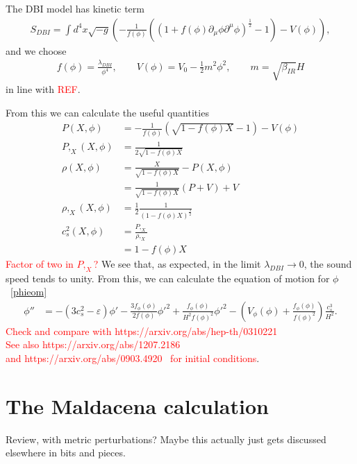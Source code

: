     The DBI model has kinetic term
\begin{align}\label{eq:dbi_action}
    S_{DBI}=\int d^4x\sqrt{-g}\left(-\frac{1}{f(\phi)}\left(\left(1+f(\phi)\partial_\mu\phi\partial^\mu\phi\right)^{\frac{1}{2}}-1\right)-V(\phi)\right),
\end{align}
and we choose
\begin{align}\label{eq:dbi_warp}
    f(\phi)=\frac{\lambda_{DBI}}{\phi^4},\qquad
    V(\phi)=V_0-\frac{1}{2}m^2\phi^2,\qquad
    m=\sqrt{\beta_{IR}}H
\end{align}
in line with \textcolor{red}{REF}.

    From this we can calculate the useful quantities
    \begin{align}
        P(X, \phi) &= -\frac{1}{f(\phi)}\left(\sqrt{1-f(\phi)X}-1\right)-V(\phi)\\
        P,_X(X, \phi) &= \frac{1}{2\sqrt{1-f(\phi)X}}\\
        \rho(X, \phi) &= \frac{X}{\sqrt{1-f(\phi)X}}-P(X,\phi)\\
                    &= \frac{1}{\sqrt{1-f(\phi)X}}(P+V)+V\\
        \rho,_X(X, \phi) &= \frac{1}{2}\frac{1}{\left(1-f(\phi)X\right)^{\frac{3}{2}}}\\
        c^2_s(X, \phi) &= \frac{P,_X}{\rho,_X}\\
                    &= 1-f(\phi)X
    \end{align}
    \textcolor{red}{Factor of two in $P,_X$?}
    We see that, as expected, in the limit $\lambda_{DBI}\rightarrow 0$, the sound
    speed tends to unity.
    From this, we can calculate the equation of motion for $\phi$~\eqref{phieom}
    \begin{align}
        \phi'' &= -(3c_s^2-\varepsilon)\phi'
                -\frac{3f_\phi(\phi)}{2f(\phi)}\phi'^2
                +\frac{f_\phi(\phi)}{H^2f(\phi)^2}\phi'^2
                -\left(V_\phi(\phi)+\frac{f_\phi(\phi)}{f(\phi)^2}\right)\frac{c_s^3}{H^2}.
    \end{align}
    \textcolor{red}{Check and compare with https://arxiv.org/abs/hep-th/0310221~\cite{dbi_silverstein}\\
    See also https://arxiv.org/abs/1207.2186~\cite{warp_features_dbi}\\
    and https://arxiv.org/abs/0903.4920~\cite{cmb_pol_ics} for initial conditions}.
    \section{The Maldacena calculation}
    Review, with metric perturbations? Maybe this actually just gets discussed elsewhere in
    bits and pieces.
